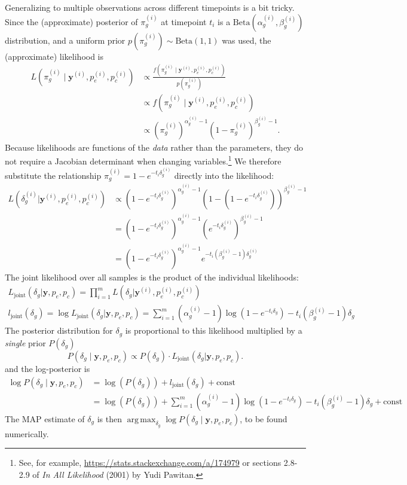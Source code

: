 \documentclass[11pt]{article}
\DeclareMathOperator*{\argmax}{arg\,max}
\begin{document}
Generalizing to multiple observations across different timepoints is a bit tricky. Since the (approximate) posterior of $\pi_g^{(i)}$ at timepoint $t_i$ is a $\mathrm{Beta}(\alpha_g^{(i)}, \beta_g^{(i)})$ distribution, and a uniform prior $p(\pi_g^{(i)}) \sim \mathrm{Beta}(1, 1)$ was used, the (approximate) likelihood is
$$
\begin{aligned}
L(\pi_g^{(i)} \mid \mathbf{y}^{(i)}, p_e^{(i)}, p_c^{(i)})
&\propto \frac{f(\pi_g^{(i)} \mid \mathbf{y}^{(i)}, p_e^{(i)}, p_c^{(i)})}{p(\pi_g^{(i)})} \\
&\propto f(\pi_g^{(i)} \mid \mathbf{y}^{(i)}, p_e^{(i)}, p_c^{(i)}) \\
&\propto \left(\pi_g^{(i)}\right)^{\alpha_g^{(i)} - 1} (1 - \pi_g^{(i)})^{\beta_g^{(i)} - 1}.
\end{aligned}
$$
Because likelihoods are functions of the \textit{data} rather than the parameters, they do not require a Jacobian determinant when changing variables.\footnote{See, for example, \url{https://stats.stackexchange.com/a/174979} or sections 2.8-2.9 of \textit{In All Likelihood} (2001) by Yudi Pawitan.} We therefore substitute the relationship $\pi_g^{(i)} = 1 - e^{-t_i \delta_g^{(i)}}$ directly into the likelihood:
$$
\begin{aligned}
L(\delta_g^{(i)} | \mathbf{y}^{(i)}, p_e^{(i)}, p_c^{(i)}) 
&\propto (1 - e^{-t_i \delta_g^{(i)}})^{\alpha_g^{(i)} - 1} (1 - (1 - e^{-t_i \delta_g^{(i)}}))^{\beta_g^{(i)} - 1} \\
&= (1 - e^{-t_i \delta_g^{(i)}})^{\alpha_g^{(i)} - 1} (e^{-t_i \delta_g^{(i)}})^{\beta_g^{(i)} - 1} \\
&= (1 - e^{-t_i \delta_g^{(i)}})^{\alpha_g^{(i)} - 1} e^{-t_i (\beta_g^{(i)} - 1) \delta_g^{(i)}}
\end{aligned}
$$
The joint likelihood over all samples is the product of the individual likelihoods:
$$
\begin{gathered}
L_\text{joint}(\delta_g | \mathbf{y}, p_e, p_c)
= \prod_{i=1}^m L(\delta_g | \mathbf{y}^{(i)}, p_e^{(i)}, p_c^{(i)}) \\
l_\text{joint}(\delta_g)
= \log L_\text{joint}(\delta_g | \mathbf{y}, p_e, p_c)
= \sum_{i=1}^m \left(\alpha_g^{(i)} - 1 \right) \log \left(1 - e^{-t_i \delta_g} \right) -t_i (\beta_g^{(i)} - 1) \delta_g
\end{gathered}
$$
The posterior distribution for $\delta_g$ is proportional to this likelihood multiplied by a \emph{single} prior $P(\delta_g)$
$$
P(\delta_g \mid \mathbf{y}, p_e, p_c) \propto P(\delta_g) \cdot L_\text{joint}(\delta_g | \mathbf{y}, p_e, p_c).
$$
and the log-posterior is
$$
\begin{aligned}
\log P(\delta_g \mid \mathbf{y}, p_e, p_c)
&= \log\left(P(\delta_g)\right) + l_\text{joint}(\delta_g) + \text{const} \\
&= \log\left(P(\delta_g)\right) + \sum_{i=1}^m \left(\alpha_g^{(i)} - 1 \right) \log \left(1 - e^{-t_i \delta_g} \right) -t_i (\beta_g^{(i)} - 1) \delta_g + \text{const}
\end{aligned}
$$
The MAP estimate of $\delta_g$ is then $\argmax_{\delta_g} \log P(\delta_g \mid \mathbf{y}, p_e, p_c)$, to be found numerically.
\end{document}
